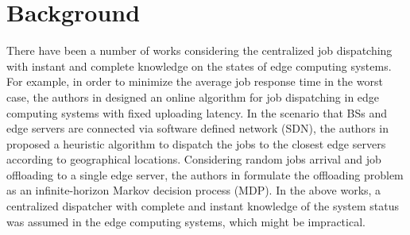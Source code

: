 
\section{Background}
\label{sec:review}

There have been a number of works considering the centralized job dispatching with instant and complete knowledge on the states of edge computing systems.
For example, in order to minimize the average job response time in the worst case, the authors in \cite{tan-online} designed an online algorithm for job dispatching in edge computing systems with fixed uploading latency.
In the scenario that BSs and edge servers are connected via software defined network (SDN), the authors in \cite{IOTJ18-FanQ} proposed a heuristic algorithm to dispatch the jobs to the closest edge servers according to geographical locations.
Considering random jobs arrival and job offloading to a single edge server, the authors in \cite{mdp-globecom,mdp-tvt} formulate the offloading problem as an infinite-horizon Markov decision process (MDP).
In the above works, a centralized dispatcher with complete and instant knowledge of the system status was assumed in the edge computing systems, which might be impractical.

